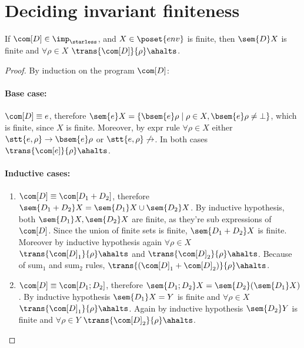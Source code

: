 \section{Deciding invariant finiteness}

\begin{lemma}\label{le:finiteness}
  If \(\com[D]\in\imp_\starless\), and \(X \in \poset{env}\) is
  finite, then \(\sem{D}X\) is finite and \(\forall \rho \in X\)
  \(\trans{\com[D]}{\rho}\ahalts\).
\end{lemma}

\begin{proof}
  By induction on the program \(\com[D]\):
  \paragraph*{Base case:\\}
  \(\com[D] \equiv e\), therefore \(\sem{e}X = \{\bsem{e}\rho \mid
  \rho \in X , \bsem{e}\rho \neq \bot\}\), which is finite, since
  \(X\) is finite. Moreover, by expr rule \(\forall \rho \in X\)
  either \(\stt{e,\rho} \to \bsem{e}\rho\) or \(\stt{e,\rho}
  \not\to\). In both cases \(\trans{\com[e]}{\rho} \ahalts\).
  
  \paragraph*{Inductive cases:\\}
  \begin{enumerate}
  \item \(\com[D]\equiv \com[D_1 + D_2]\), therefore \(\sem{D_1 + D_2}
    X = \sem{D_1}X \cup \sem{D_2}X\). By inductive hypothesis, both
    \(\sem{D_1}X, \sem{D_2}X\) are finite, as they're sub expressions
    of \(\com[D]\). Since the union of finite sets is finite,
    \(\sem{D_1 + D_2}X\) is finite. Moreover by inductive hypothesis
    again \(\forall \rho \in X\) \(\trans{\com[D]_1}{\rho}\ahalts\)
    and \(\trans{\com[D]_2}{\rho}\ahalts\). Because of sum\(_1\) and
    sum\(_2\) rules, \(\trans{(\com[D]_1 + \com[D]_2)}{\rho}\ahalts\).
  \item \(\com[D]\equiv \com[D_1; D_2]\), therefore \(\sem{D_1;D_2}X =
    \sem{D_2}(\sem{D_1}X)\). By inductive hypothesis \(\sem{D_1}X =
    Y\) is finite and \(\forall \rho \in X\)
    \(\trans{\com[D]_1}{\rho}\ahalts\). Again by inductive hypothesis
    \(\sem{D_2}Y\) is finite and \(\forall \rho \in Y\)
    \(\trans{\com[D]_2}{\rho}\ahalts\).
  \end{enumerate}
\end{proof}

